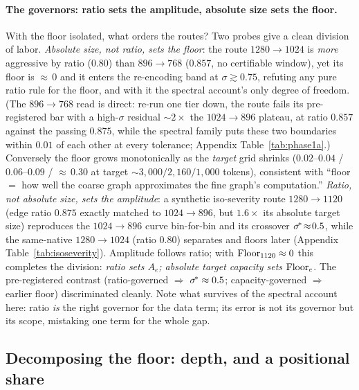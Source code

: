 \paragraph{The governors: ratio sets the amplitude, absolute size sets
the floor.}
With the floor isolated, what orders the routes? Two probes give a clean
division of labor.
\emph{Absolute size, not ratio, sets the floor}: the route
$1280{\to}1024$ is \emph{more} aggressive by ratio ($0.80$) than
$896{\to}768$ ($0.857$, no certifiable window), yet its floor is
${\approx}\,0$ and it enters the re-encoding band at
$\sigma \gtrsim 0.75$, refuting any pure ratio rule for the floor,
and with it the spectral account's only degree of freedom. (The $896{\to}768$ read
is direct: re-run one tier down, the route fails its pre-registered bar
with a high-$\sigma$ residual ${\sim}2\times$ the $1024{\to}896$
plateau, at ratio $0.857$ against the passing $0.875$, while the
spectral family puts these two boundaries within $0.01$ of each other at every
tolerance; Appendix Table~\ref{tab:phase1a}.) Conversely the floor
grows monotonically as the \emph{target} grid shrinks
($0.02$--$0.04$ / $0.06$--$0.09$ / ${\approx}\,0.30$ at
target ${\sim}3{,}000 / 2{,}160 / 1{,}000$ tokens), consistent with
``floor $=$ how well the coarse graph approximates the fine graph's
computation.''
\emph{Ratio, not absolute size, sets the amplitude}: a synthetic
iso-severity route $1280{\to}1120$ (edge ratio $0.875$ exactly
matched to $1024{\to}896$, but $1.6\times$ its absolute target size)
reproduces the $1024{\to}896$ curve bin-for-bin and its crossover
$\sigma^{\!*}\!\approx\!0.5$, while the same-native $1280{\to}1024$ (ratio
$0.80$) separates and floors later (Appendix
Table~\ref{tab:isoseverity}). Amplitude follows ratio; with
$\mathrm{Floor}_{1120} \approx 0$ this completes the division: \emph{ratio sets
$A_e$; absolute target capacity sets $\mathrm{Floor}_e$}. The pre-registered
contrast (ratio-governed $\Rightarrow$ $\sigma^{\!*} \approx 0.5$;
capacity-governed $\Rightarrow$ earlier floor) discriminated cleanly.
Note what survives of the spectral account here: ratio \emph{is} the
right governor for the data term; its error is not its
governor but its scope, mistaking one term for the whole gap.

\subsection{Decomposing the floor: depth, and a positional share}
\label{sec:decomposition}

